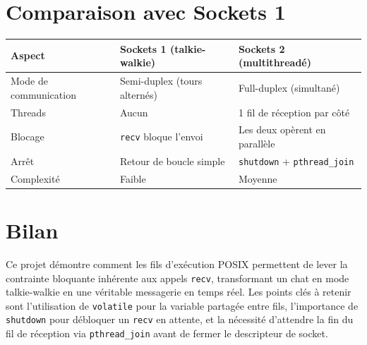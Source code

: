 \documentclass[12pt,a4paper]{article}
\begin{document}
\section{Comparaison avec Sockets 1}

\begin{center}
\begin{tabular}{@{}lll@{}}
\toprule
Aspect & Sockets 1 (talkie-walkie) & Sockets 2 (multithreadé) \\
\midrule
Mode de communication & Semi-duplex (tours alternés) & Full-duplex (simultané) \\
Threads & Aucun & 1 fil de réception par côté \\
Blocage & \texttt{recv} bloque l'envoi & Les deux opèrent en parallèle \\
Arrêt & Retour de boucle simple & \texttt{shutdown} + \texttt{pthread\_join} \\
Complexité & Faible & Moyenne \\
\bottomrule
\end{tabular}
\end{center}

\section{Bilan}

Ce projet démontre comment les fils d'exécution POSIX permettent de lever la
contrainte bloquante inhérente aux appels \texttt{recv}, transformant un chat
en mode talkie-walkie en une véritable messagerie en temps réel. Les points
clés à retenir sont l'utilisation de \texttt{volatile} pour la variable
partagée entre fils, l'importance de \texttt{shutdown} pour débloquer un
\texttt{recv} en attente, et la nécessité d'attendre la fin du fil de
réception via \texttt{pthread\_join} avant de fermer le descripteur de socket.
\end{document}
